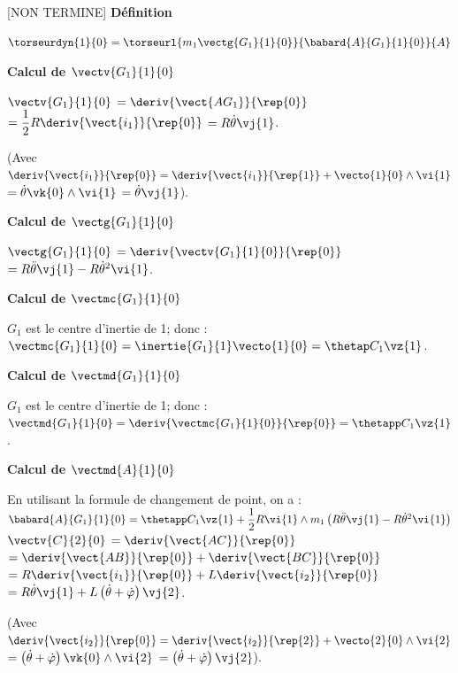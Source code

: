 \begin{corrigebox}
[NON TERMINE]
\textbf{Définition}

$\torseurdyn{1}{0} = \torseurl{m_1 \vectg{G_1}{1}{0}}{\babard{A}{G_1}{1}{0}}{A}$

\textbf{Calcul de $\vectv{G_1}{1}{0}$}

$\vectv{G_1}{1}{0}$ $ = \deriv{\vect{AG_1}}{\rep{0}}$
$ = \dfrac{1}{2}R\deriv{\vect{i_1}}{\rep{0}}$
$ = R\dot{\theta}\vj{1}$.

(Avec $\deriv{\vect{i_1}}{\rep{0}} = \deriv{\vect{i_1}}{\rep{1}} + \vecto{1}{0}\wedge \vi{1}$
$ = \dot{\theta}\vk{0}\wedge \vi{1}$ $ = \dot{\theta}\vj{1}$).

\textbf{Calcul de $\vectg{G_1}{1}{0}$}

$\vectg{G_1}{1}{0}$ $ = \deriv{{\vectv{G_1}{1}{0}}}{\rep{0}}$
$ =  R\ddot{\theta}\vj{1} - R\dot{\theta}^2\vi{1} $.

\textbf{Calcul de $\vectmc{G_1}{1}{0}$}

$G_1$ est le centre d'inertie de 1; donc : 
$\vectmc{G_1}{1}{0} = \inertie{G_1}{1}\vecto{1}{0} = \thetap C_1 \vz{1}$.

\textbf{Calcul de $\vectmd{G_1}{1}{0}$}

$G_1$ est le centre d'inertie de 1; donc : 
$\vectmd{G_1}{1}{0} = \deriv{\vectmc{G_1}{1}{0}}{\rep{0}} = \thetapp C_1 \vz{1}$.

\textbf{Calcul de $\vectmd{A}{1}{0}$}

En utilisant la formule de changement de point, on a : 
$\babard{A}{G_1}{1}{0} = \thetapp C_1 \vz{1} + \dfrac{1}{2}R\vi{1} \wedge m_1 \left( R\ddot{\theta}\vj{1} - R\dot{\theta}^2\vi{1}\right)$
$\vectv{C}{2}{0}$ $ = \deriv{\vect{AC}}{\rep{0}}$
$ = \deriv{\vect{AB}}{\rep{0}}+\deriv{\vect{BC}}{\rep{0}}$
$ = R\deriv{\vect{i_1}}{\rep{0}}+L\deriv{\vect{i_2}}{\rep{0}}$
$ = R\dot{\theta}\vj{1}+L\left( \dot{\theta}+\dot{\varphi}\right)\vj{2}$.

(Avec $\deriv{\vect{i_2}}{\rep{0}} = \deriv{\vect{i_2}}{\rep{2}} + \vecto{2}{0}\wedge \vi{2}$
$ = \left( \dot{\theta}+\dot{\varphi}\right)\vk{0}\wedge \vi{2}$ $ = \left( \dot{\theta}+\dot{\varphi}\right)\vj{2}$).
\end{corrigebox}
